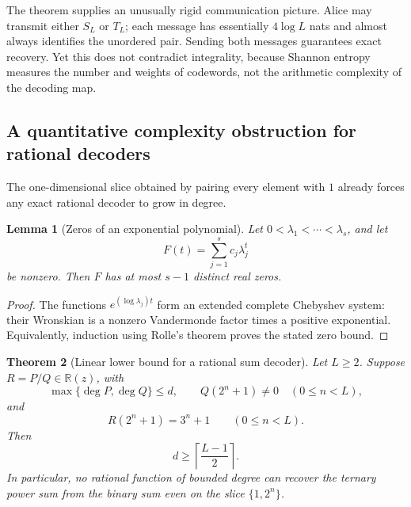 \documentclass[11pt,oneside]{article}
\newtheorem{theorem}{Theorem}[section]
\newtheorem{lemma}[theorem]{Lemma}
\theoremstyle{definition}
\theoremstyle{remark}
\newcommand{\R}{\mathbb{R}}
\newcommand{\ceil}[1]{\left\lceil #1\right\rceil}
\begin{document}
The theorem supplies an unusually rigid communication picture.  Alice may transmit either \(S_L\) or \(T_L\); each message has essentially \(4\log L\) nats and almost always identifies the unordered pair.  Sending both messages guarantees exact recovery.  Yet this does not contradict integrality, because Shannon entropy measures the number and weights of codewords, not the arithmetic complexity of the decoding map.

\subsection{A quantitative complexity obstruction for rational decoders}

The one-dimensional slice obtained by pairing every element with \(1\) already forces any exact rational decoder to grow in degree.

\begin{lemma}[Zeros of an exponential polynomial]\label{lem:exp-chebyshev}
Let \(0<\lambda_1<\cdots<\lambda_s\), and let
\[
 F(t)=\sum_{j=1}^s c_j\lambda_j^t
\]
be nonzero.  Then \(F\) has at most \(s-1\) distinct real zeros.
\end{lemma}

\begin{proof}
The functions \(e^{(\log\lambda_j)t}\) form an extended complete Chebyshev system: their Wronskian is a nonzero Vandermonde factor times a positive exponential.  Equivalently, induction using Rolle's theorem proves the stated zero bound.
\end{proof}

\begin{theorem}[Linear lower bound for a rational sum decoder]\label{thm:decoder-degree}
Let \(L\geq2\).  Suppose \(R=P/Q\in\R(z)\), with
\[
 \max\{\deg P,\deg Q\}\leq d,
 \qquad Q(2^n+1)\neq0\quad(0\leq n<L),
\]
and
\begin{equation}\label{eq:decoder-interpolation}
 R(2^n+1)=3^n+1\qquad(0\leq n<L).
\end{equation}
Then
\begin{equation}\label{eq:degree-lower}
 d\geq\ceil{\frac{L-1}{2}}.
\end{equation}
In particular, no rational function of bounded degree can recover the ternary power sum from the binary sum even on the slice \(\{1,2^n\}\).
\end{theorem}
\end{document}
